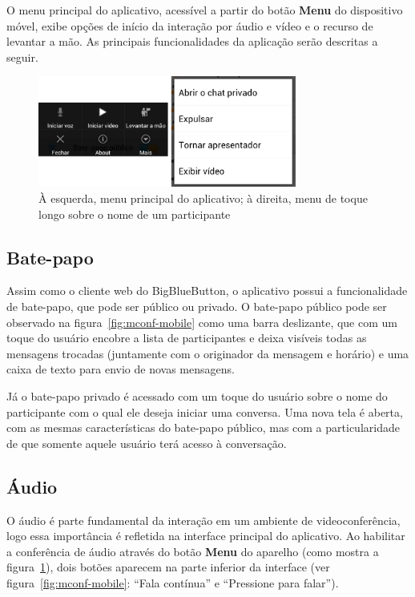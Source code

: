 \documentclass{acm_proc_article-sp}
\begin{document}
O menu principal do aplicativo, acessível a partir do botão \textbf{Menu} do dispositivo móvel, exibe opções de início da interação por áudio e vídeo e o recurso de levantar a mão. As principais funcionalidades da aplicação serão descritas a seguir.

\begin{figure}[htp]
\centering
\includegraphics[width=85mm]{menu_merged.png}
\caption{À esquerda, menu principal do aplicativo; à direita, menu de toque longo sobre o nome de um participante}\label{fig:menu}
\end{figure}

\subsection{Bate-papo}

Assim como o cliente web do BigBlueButton, o aplicativo possui a funcionalidade de bate-papo, que pode ser público ou privado. O bate-papo público pode ser observado na figura~\ref{fig:mconf-mobile} como uma barra deslizante, que com um toque do usuário encobre a lista de participantes e deixa visíveis todas as mensagens trocadas (juntamente com o originador da mensagem e horário) e uma caixa de texto para envio de novas mensagens.

Já o bate-papo privado é acessado com um toque do usuário sobre o nome do participante com o qual ele deseja iniciar uma conversa. Uma nova tela é aberta, com as mesmas características do bate-papo público, mas com a particularidade de que somente aquele usuário terá acesso à conversação.

\subsection{Áudio}

O áudio é parte fundamental da interação em um ambiente de videoconferência, logo essa importância é refletida na interface principal do aplicativo. Ao habilitar a conferência de áudio através do botão \textbf{Menu} do aparelho (como mostra a figura~\ref{fig:menu}), dois botões aparecem na parte inferior da interface (ver figura~\ref{fig:mconf-mobile}: ``Fala contínua'' e ``Pressione para falar'').
\end{document}
